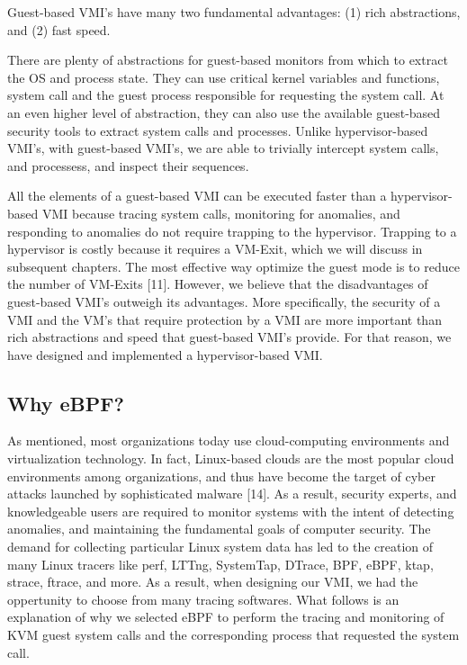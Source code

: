\documentclass{report}
\begin{document}
\begin{spacing}{1.5}
{\large
Guest-based VMI's have many two fundamental advantages: (1) rich abstractions, and (2) fast speed. 
\newline
}

{\large
There are plenty of abstractions for guest-based monitors from which to extract the OS and process state. They can use critical kernel variables and functions, system call and the guest process responsible for requesting the system call. At an even higher level of abstraction, they can also use the available guest-based security tools to extract system calls and processes. Unlike hypervisor-based VMI's, with guest-based VMI's, we are able to trivially intercept system calls, and processess, and inspect their sequences.
\newline
}


{\large
All the elements of a guest-based VMI can be executed faster than a hypervisor-based VMI because tracing system calls, monitoring for anomalies, and responding to anomalies do not require trapping to the hypervisor. Trapping to a hypervisor is costly because it requires a VM-Exit, which we will discuss in subsequent chapters. The most effective way optimize the guest mode is to reduce the number of VM-Exits [11]. However, we believe that the disadvantages of guest-based VMI's outweigh its advantages. More specifically, the security of a VMI and the VM's that require protection by a VMI are more important than rich abstractions and speed that guest-based VMI's provide. For that reason, we have designed and implemented a hypervisor-based VMI.
\newline
}














\subsection{Why eBPF?}

{\large
As mentioned, most organizations today use cloud-computing environments and virtualization technology. In fact, Linux-based clouds are the most popular cloud environments among organizations, and thus have become the target of cyber attacks launched by sophisticated malware [14]. As a result, security experts, and knowledgeable users are required to monitor systems with the intent of detecting anomalies, and maintaining the fundamental goals of computer security. The demand for collecting particular Linux system data has led to the creation of many Linux tracers like perf, LTTng, SystemTap, DTrace, BPF, eBPF, ktap, strace, ftrace, and more. As a result, when designing our VMI, we had the oppertunity to choose from many tracing softwares. What follows is an explanation of why we selected eBPF to perform the tracing and monitoring of KVM guest system calls and the corresponding process that requested the system call.
\newline
}


\end{spacing}
\end{document}
